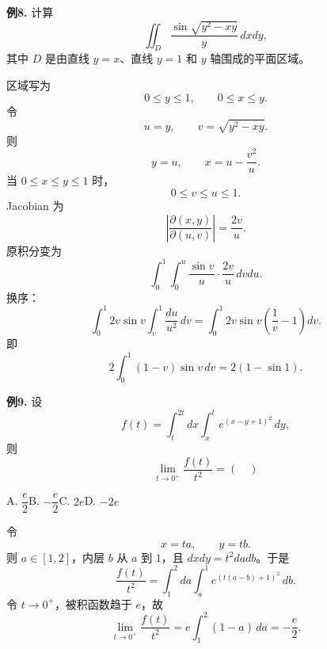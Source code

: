 \begin{problemblock}
\textbf{例8.} 计算
\[
\iint_D\frac{\sin\sqrt{y^2-xy}}{y}\,dxdy,
\]
其中 \(D\) 是由直线 \(y=x\)、直线 \(y=1\) 和 \(y\) 轴围成的平面区域。
\end{problemblock}
\begin{solutionblock}
区域写为
\[
0\le y\le1,\qquad 0\le x\le y.
\]
令
\[
u=y,\qquad v=\sqrt{y^2-xy}.
\]
则
\[
y=u,\qquad x=u-\frac{v^2}{u}.
\]
当 \(0\le x\le y\le1\) 时，
\[
0\le v\le u\le1.
\]
Jacobian 为
\[
\left|\frac{\partial(x,y)}{\partial(u,v)}\right|
=\frac{2v}{u}.
\]
原积分变为
\[
\int_0^1\int_0^u \frac{\sin v}{u}\cdot\frac{2v}{u}\,dvdu.
\]
换序：
\[
\int_0^1 2v\sin v\int_v^1\frac{du}{u^2}\,dv
=\int_0^1 2v\sin v\left(\frac1v-1\right)dv.
\]
即
\[
2\int_0^1(1-v)\sin v\,dv
=2(1-\sin1).
\]
\end{solutionblock}

\begin{problemblock}
\textbf{例9.} 设
\[
f(t)=\int_t^{2t}dx\int_x^t e^{(x-y+1)^2}\,dy,
\]
则
\[
\lim_{t\to0^+}\frac{f(t)}{t^2}=(\quad)
\]

A. \(\dfrac e2\)\qquad B. \(-\dfrac e2\)\qquad C. \(2e\)\qquad D. \(-2e\)
\end{problemblock}
\begin{solutionblock}
令
\[
x=ta,\qquad y=tb.
\]
则 \(a\in[1,2]\)，内层 \(b\) 从 \(a\) 到 \(1\)，且 \(dxdy=t^2dadb\)。于是
\[
\frac{f(t)}{t^2}
=\int_1^2 da\int_a^1 e^{(t(a-b)+1)^2}\,db.
\]
令 \(t\to0^+\)，被积函数趋于 \(e\)，故
\[
\lim_{t\to0^+}\frac{f(t)}{t^2}
=e\int_1^2(1-a)\,da
=-\frac e2.
\]
\end{solutionblock}


